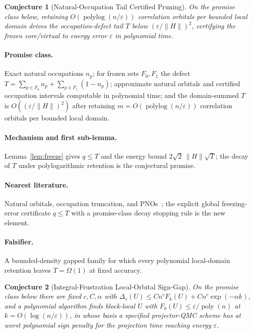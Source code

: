 \documentclass[11pt]{article}
\newtheorem{conjecture}{Conjecture}
\theoremstyle{definition}
\newcommand{\eps}{\varepsilon}
\newcommand{\poly}{\operatorname{poly}}
\newcommand{\polylog}{\operatorname{polylog}}
\begin{document}
\begin{conjecture}[Natural-Occupation Tail Certified Pruning]\label{p7}
On the promise class below, retaining $O(\polylog(n/\eps))$ correlation orbitals
per bounded local domain drives the occupation-defect tail $T$ below
$(\eps/\lVert H\rVert)^2$, certifying the frozen core/virtual to energy error
$\eps$ in polynomial time.
\end{conjecture}
\paragraph{Promise class.}  Exact natural occupations $n_p$; for frozen sets
$F_0,F_1$ the defect $T=\sum_{p\in F_0}n_p+\sum_{p\in F_1}(1-n_p)$; approximate
natural orbitals and certified occupation intervals computable in polynomial time;
and the domain-summed $T$ is $O((\eps/\lVert H\rVert)^2)$ after retaining
$m=O(\polylog(n/\eps))$ correlation orbitals per bounded local domain.
\paragraph{Mechanism and first sub-lemma.}  Lemma~\ref{lem:freeze} gives $q\le T$
and the energy bound $2\sqrt2\,\lVert H\rVert\sqrt T$; the decay of $T$ under
polylogarithmic retention is the conjectural promise.
\paragraph{Nearest literature.}  Natural orbitals, occupation truncation, and
PNOs~\cite{R15}; the explicit global freezing-error certificate $q\le T$ with a
promise-class decay stopping rule is the new element.
\paragraph{Falsifier.}  A bounded-density gapped family for which every polynomial
local-domain retention leaves $T=\Omega(1)$ at fixed accuracy.

\begin{conjecture}[Integral-Frustration Local-Orbital Sign-Gap]\label{p8}
On the promise class below there are fixed $c,C,\alpha$ with
$\Delta_s(U)\le Cn^cF_k(U)+Cn^c\exp(-\alpha k)$, and a polynomial algorithm finds
block-local $U$ with $F_k(U)\le\eps/\poly(n)$ at $k=O(\log(n/\eps))$, in whose
basis a specified projector-QMC scheme has at worst polynomial sign penalty for
the projection time reaching energy $\eps$.
\end{conjecture}
\end{document}
